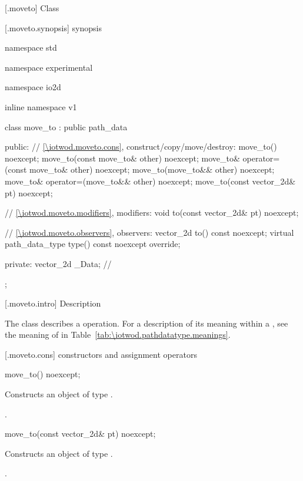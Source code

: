  [\iotwod.moveto] {Class }

 [\iotwod.moveto.synopsis] { synopsis}

\begin{codeblock}
namespace std { namespace experimental { namespace io2d { inline namespace v1 {
  class move_to : public path_data {
  public:
    // \ref{\iotwod.moveto.cons}, construct/copy/move/destroy:
    move_to() noexcept;
    move_to(const move_to& other) noexcept;
    move_to& operator=(const move_to& other) noexcept;
    move_to(move_to&& other) noexcept;
    move_to& operator=(move_to&& other) noexcept;
    move_to(const vector_2d& pt) noexcept;

    // \ref{\iotwod.moveto.modifiers}, modifiers:
    void to(const vector_2d& pt) noexcept;

    // \ref{\iotwod.moveto.observers}, observers:
    vector_2d to() const noexcept;
    virtual path_data_type type() const noexcept override;
    
  private:
    vector_2d _Data; // \expos
  };
} } } }
\end{codeblock}

 [\iotwod.moveto.intro] { Description}

\pnum
{}
The class  describes a  operation. For a description of its meaning within a , see the meaning of  in Table~\ref{tab:\iotwod.pathdatatype.meanings}.

 [\iotwod.moveto.cons] { constructors and assignment operators}

\begin{itemdecl}
    move_to() noexcept;
\end{itemdecl}
\begin{itemdescr}
	\pnum
	\effects
	Constructs an object of type .
	
	\pnum
	\postconditions
	.
\end{itemdescr}

\begin{itemdecl}
    move_to(const vector_2d& pt) noexcept;
\end{itemdecl}
\begin{itemdescr}
	\pnum
	\effects
	Constructs an object of type .
	
	\pnum
	\postconditions
	.
\end{itemdescr}

